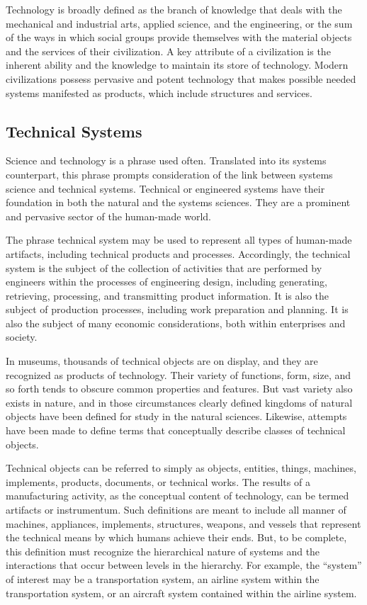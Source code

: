 Technology is broadly defined as the branch of knowledge that deals with the mechanical and industrial arts, applied science, and the engineering, or the sum of the ways in which social groups provide themselves with the material objects and the services of their civilization. A key attribute of a civilization is the inherent ability and the knowledge to maintain its store of technology. Modern civilizations possess pervasive and potent technology that makes possible needed systems manifested as products, which include structures and services.

\subsection{Technical Systems}

Science and technology is a phrase used often. Translated into its systems counterpart, this phrase prompts consideration of the link between systems science and technical systems. Technical or engineered systems have their foundation in both the natural and the systems sciences. They are a prominent and pervasive sector of the human-made world.

The phrase technical system may be used to represent all types of human-made artifacts, including technical products and processes. Accordingly, the technical system is the subject of the collection of activities that are performed by engineers within the processes of engineering design, including generating, retrieving, processing, and transmitting product information. It is also the subject of production processes, including work preparation and planning. It is also the subject of many economic considerations, both within enterprises and society.

In museums, thousands of technical objects are on display, and they are recognized as products of technology. Their variety of functions, form, size, and so forth tends to obscure common properties and features. But vast variety also exists in nature, and in those circumstances clearly defined kingdoms of natural objects have been defined for study in the natural sciences. Likewise, attempts have been made to define terms that conceptually describe classes of technical objects.

Technical objects can be referred to simply as objects, entities, things, machines, implements, products, documents, or technical works. The results of a manufacturing activity, as the conceptual content of technology, can be termed artifacts or instrumentum. Such definitions are meant to include all manner of machines, appliances, implements, structures, weapons, and vessels that represent the technical means by which humans achieve their ends. But, to be complete, this definition must recognize the hierarchical nature of systems and the interactions that occur between levels in the hierarchy. For example, the ``system'' of interest may be a transportation system, an airline system within the transportation system, or an aircraft system contained within the airline system.

